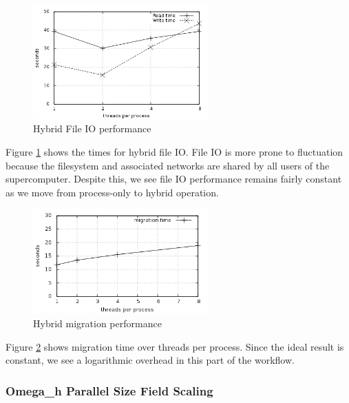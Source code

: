 \begin{figure}[!ht]
\begin{center}
\caption{Hybrid File IO performance}
\label{fig:pcu_fileio}
\includegraphics[width=0.6\textwidth]{pcu_fileio.png}
\end{center}
\end{figure}

Figure \ref{fig:pcu_fileio} shows the times for hybrid file IO.
File IO is more prone to fluctuation because the filesystem
and associated networks are shared by all users of the supercomputer.
Despite this, we see file IO performance remains
fairly constant as we move from process-only to hybrid operation.

\begin{figure}[!ht]
\begin{center}
\caption{Hybrid migration performance}
\label{fig:pcu_migrate}
\includegraphics[width=0.6\textwidth]{pcu_migrate.png}
\end{center}
\end{figure}

Figure \ref{fig:pcu_migrate} shows migration time over threads per process.
Since the ideal result is constant, we see a logarithmic overhead
in this part of the workflow.

\subsubsection{Omega\_h Parallel Size Field Scaling}
\label{sec:osh_scale}

